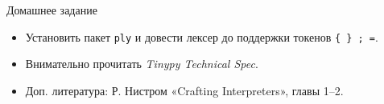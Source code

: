 \documentclass[aspectratio=169]{beamer}
\begin{document}
\begin{frame}{Домашнее задание}
	\begin{itemize}
		\item Установить пакет \texttt{ply} и довести лексер до поддержки токенов \texttt{\{ \} ; =}.
		\item Внимательно прочитать \emph{Tinypy Technical Spec}.
		\item \small Доп. литература: Р. Нистром «Crafting Interpreters», главы 1–2.
	\end{itemize}
\end{frame}
\end{document}
